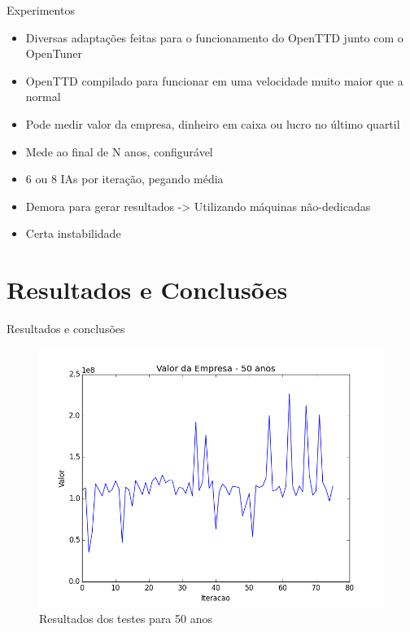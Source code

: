 \documentclass[10pt]{beamer}
\begin{document}
\begin{frame}{Experimentos}
	\begin{itemize}
	\item Diversas adaptações feitas para o funcionamento do OpenTTD junto com o OpenTuner \pause\\
	\item OpenTTD compilado para funcionar em uma velocidade muito maior que a normal\pause\\
	\item Pode medir valor da empresa, dinheiro em caixa ou lucro no último quartil\pause\\
	\item Mede ao final de N anos, configurável\pause\\
	\item 6 ou 8 IAs por iteração, pegando média\pause\\
	\item Demora para gerar resultados \pause -> Utilizando máquinas não-dedicadas\pause\\
	\item Certa instabilidade
	\end{itemize}
\end{frame}

\section{Resultados e Conclusões}

\begin{frame}{Resultados e conclusões}
	\begin{figure}
		\centering
		\includegraphics[width=1\linewidth]{value-50yrs}
		\caption{Resultados dos testes para 50 anos}
		\label{fig:value-50yrs}
	\end{figure}
	
\end{frame}
\end{document}
